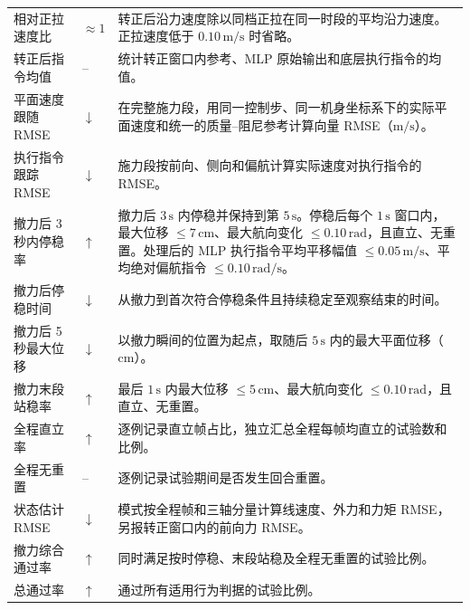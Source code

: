 \begin{longtable}{@{}P{39mm}>{\centering\arraybackslash}p{11mm}P{\dimexpr\textwidth-50mm-4\tabcolsep\relax}@{}}
\evaluationrowrule
相对正拉速度比 & $\approx 1$ & 转正后沿力速度除以同档正拉在同一时段的平均沿力速度。正拉速度低于 $0.10\,\mathrm{m/s}$ 时省略。 \\
\evaluationrowrule
转正后指令均值 & -- & 统计转正窗口内参考、MLP 原始输出和底层执行指令的均值。 \\
\evaluationrowrule
平面速度跟随 RMSE & $\downarrow$ & 在完整施力段，用同一控制步、同一机身坐标系下的实际平面速度和统一的质量--阻尼参考计算向量 RMSE（$\mathrm{m/s}$）。 \\
\evaluationrowrule
执行指令跟踪 RMSE & $\downarrow$ & 施力段按前向、侧向和偏航计算实际速度对执行指令的 RMSE。 \\
\evaluationrowrule
撤力后 3 秒内停稳率 & $\uparrow$ & 撤力后 $3\,\mathrm{s}$ 内停稳并保持到第 $5\,\mathrm{s}$。停稳后每个 $1\,\mathrm{s}$ 窗口内，最大位移 $\le 7\,\mathrm{cm}$、最大航向变化 $\le 0.10\,\mathrm{rad}$，且直立、无重置。处理后的 MLP 执行指令平均平移幅值 $\le 0.05\,\mathrm{m/s}$、平均绝对偏航指令 $\le 0.10\,\mathrm{rad/s}$。 \\
\evaluationrowrule
撤力后停稳时间 & $\downarrow$ & 从撤力到首次符合停稳条件且持续稳定至观察结束的时间。 \\
\evaluationrowrule
撤力后 5 秒最大位移 & $\downarrow$ & 以撤力瞬间的位置为起点，取随后 $5\,\mathrm{s}$ 内的最大平面位移（$\mathrm{cm}$）。 \\
\evaluationrowrule
撤力末段站稳率 & $\uparrow$ & 最后 $1\,\mathrm{s}$ 内最大位移 $\le 5\,\mathrm{cm}$、最大航向变化 $\le 0.10\,\mathrm{rad}$，且直立、无重置。 \\
\evaluationrowrule
全程直立率 & $\uparrow$ & 逐例记录直立帧占比，独立汇总全程每帧均直立的试验数和比例。 \\
\evaluationrowrule
全程无重置 & -- & 逐例记录试验期间是否发生回合重置。 \\
\evaluationrowrule
状态估计 RMSE & $\downarrow$ &  模式按全程帧和三轴分量计算线速度、外力和力矩 RMSE，另报转正窗口内的前向力 RMSE。 \\
\evaluationrowrule
撤力综合通过率 & $\uparrow$ & 同时满足按时停稳、末段站稳及全程无重置的试验比例。 \\
\evaluationrowrule
总通过率 & $\uparrow$ & 通过所有适用行为判据的试验比例。 \\
\end{longtable}
\endgroup
